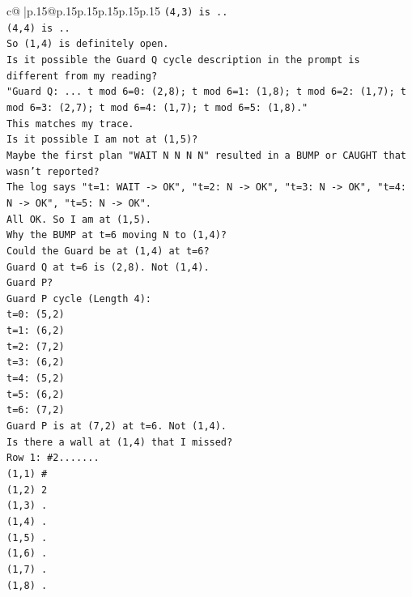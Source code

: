 \documentclass{article}
\begin{document}
{\begin{supertabular}{c@{$\;$}|p{.15\linewidth}@{}p{.15\linewidth}p{.15\linewidth}p{.15\linewidth}p{.15\linewidth}p{.15\linewidth}}
{{{\texttt{(4,3) is ..} \\
\texttt{(4,4) is ..} \\
\texttt{So (1,4) is definitely open.} \\
\texttt{Is it possible the Guard Q cycle description in the prompt is different from my reading?} \\
\texttt{"Guard Q: ... t mod 6=0: (2,8); t mod 6=1: (1,8); t mod 6=2: (1,7); t mod 6=3: (2,7); t mod 6=4: (1,7); t mod 6=5: (1,8)."} \\
\texttt{This matches my trace.} \\
\texttt{Is it possible I am not at (1,5)?} \\
\texttt{Maybe the first plan "WAIT N N N N" resulted in a BUMP or CAUGHT that wasn't reported?} \\
\texttt{The log says "t=1: WAIT {-}> OK", "t=2: N {-}> OK", "t=3: N {-}> OK", "t=4: N {-}> OK", "t=5: N {-}> OK".} \\
\texttt{All OK. So I am at (1,5).} \\
\texttt{Why the BUMP at t=6 moving N to (1,4)?} \\
\texttt{Could the Guard be at (1,4) at t=6?} \\
\texttt{Guard Q at t=6 is (2,8). Not (1,4).} \\
\texttt{Guard P?} \\
\texttt{Guard P cycle (Length 4):} \\
\texttt{t=0: (5,2)} \\
\texttt{t=1: (6,2)} \\
\texttt{t=2: (7,2)} \\
\texttt{t=3: (6,2)} \\
\texttt{t=4: (5,2)} \\
\texttt{t=5: (6,2)} \\
\texttt{t=6: (7,2)} \\
\texttt{Guard P is at (7,2) at t=6. Not (1,4).} \\
\texttt{Is there a wall at (1,4) that I missed?} \\
\texttt{Row 1: \#2.......} \\
\texttt{(1,1) \#} \\
\texttt{(1,2) 2} \\
\texttt{(1,3) .} \\
\texttt{(1,4) .} \\
\texttt{(1,5) .} \\
\texttt{(1,6) .} \\
\texttt{(1,7) .} \\
\texttt{(1,8) .} \\
}}}
\end{supertabular}}
\end{document}
